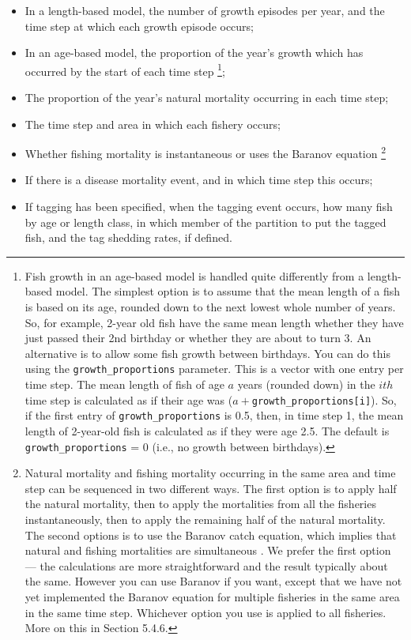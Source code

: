 \begin{itemize}
\item	In a length-based model, the number of growth episodes per year, and the time step at which each growth episode occurs;
\item	In an age-based model, the proportion of the year’s growth which has occurred by the start of each time step \footnote{Fish growth in an age-based model is handled quite differently from a length-based model. The simplest option is to assume that the mean length of a fish is based on its age, rounded down to the next lowest whole number of years. So, for example, 2-year old fish have the same mean length whether they have just passed their 2nd birthday or whether they are about to turn 3. An alternative is to allow some fish growth between birthdays. You can do this using the \texttt{growth\_proportions} parameter. This is a vector with one entry per time step. The mean length of fish of age $a$ years (rounded down) in the $ith$ time step is calculated as if their age was ($a+$\texttt{growth\_proportions[i]}). So, if the first entry of \texttt{growth\_proportions} is 0.5, then, in time step 1, the mean length of 2-year-old fish is calculated as if they were age 2.5. The default is \texttt{growth\_proportions} = 0 (i.e., no growth between birthdays).};
\item	The proportion of the year’s natural mortality occurring in each time step;
\item	The time step and area in which each fishery occurs;
\item Whether fishing mortality is instantaneous or uses the Baranov equation \footnote{
  Natural mortality and fishing mortality occurring in the same area and time step can be sequenced in two different ways. The first option is to apply half the natural mortality, then to apply the mortalities from all the fisheries instantaneously, then to apply the remaining half of the natural mortality. The second options is to use the Baranov catch equation, which implies that natural and fishing mortalities are simultaneous . We prefer the first option — the calculations are more straightforward and the result typically about the same. However you can use Baranov if you want, except that we have not yet implemented the Baranov equation for multiple fisheries in the same area in the same time step. Whichever option you use is applied to all fisheries. More on this in Section 5.4.6.
}
\item If there is a disease mortality event, and in which time step this occurs;
\item	If tagging has been specified, when the tagging event occurs, how many fish by age or length class, in which member of the partition to put the tagged fish, and the tag shedding rates, if defined.
\end{itemize}

